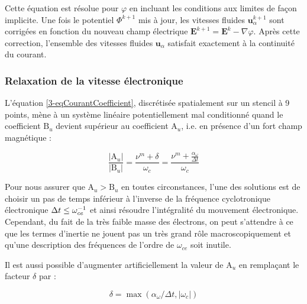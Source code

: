\begin{refsection}
Cette équation est résolue pour $\varphi$ en incluant les conditions aux limites
de façon implicite. Une fois le potentiel $\Phi^{k+1}$ mis à jour, les vitesses
fluides $\mathbf u^{k+1}_\alpha$ sont corrigées en fonction du nouveau champ
électrique $\mathbf{E}^{k+1}=\mathbf{E}^{k}-\nabla\varphi$.
Après cette correction, l'ensemble des vitesses fluides $\mathbf u_\alpha$
satisfait exactement à la continuité du courant.

\subsubsection{Relaxation de la vitesse électronique}

L'équation \eqref{3-eqCourantCoefficient}, discrétisée spatialement sur un
stencil à 9 points, mène à un système linéaire potentiellement mal conditionné
quand le coefficient $\text{B}_u$ devient supérieur au coefficient $\text{A}_u$,
i.e. en présence d'un fort champ magnétique :

\begin{equation}
\frac{|\text{A}_u|}{|\text{B}_u|}=\frac{\nu^m+\delta}{\omega_c}=\frac{\nu^m+\frac{\alpha_\omega}{\Delta
t}}{\omega_c}
\end{equation}

Pour nous assurer que $\text{A}_u>\text{B}_u$ en toutes circonstances, l'une
des solutions est de choisir un pas de temps inférieur à l'inverse de la
fréquence cyclotronique électronique $\Delta t\leq\omega_{ce}^{{-1}}$ et
ainsi résoudre l'intégralité du mouvement électronique. Cependant, du fait de
la très faible masse des électrons, on peut s'attendre à ce que les termes
d'inertie ne jouent pas un très grand rôle macroscopiquement et qu'une
description des fréquences de l'ordre de $\omega_{ce}$ soit inutile.

Il est aussi possible d'augmenter artificiellement la valeur de $\text{A}_u$ en
remplaçant le facteur $\delta$ par :

\begin{equation}
\delta=\max(\alpha_\omega/\Delta t,|\omega_c|)
\end{equation}


\end{refsection}
